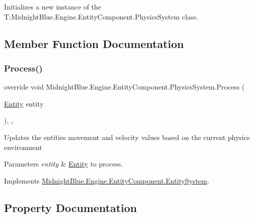 Initializes a new instance of the T\+:\+Midnight\+Blue.\+Engine.\+Entity\+Component.\+Physics\+System class. 



\subsection{Member Function Documentation}
\hypertarget{class_midnight_blue_1_1_engine_1_1_entity_component_1_1_physics_system_ab54f8db4bba2df1072b0fa3a3f4d47de}{}\label{class_midnight_blue_1_1_engine_1_1_entity_component_1_1_physics_system_ab54f8db4bba2df1072b0fa3a3f4d47de} 
\subsubsection{\texorpdfstring{Process()}{Process()}}
{\footnotesize\ttfamily override void Midnight\+Blue.\+Engine.\+Entity\+Component.\+Physics\+System.\+Process (\begin{DoxyParamCaption}\item[{\hyperlink{class_midnight_blue_1_1_engine_1_1_entity_component_1_1_entity}{Entity}}]{entity }\end{DoxyParamCaption})\hspace{0.3cm}{\ttfamily [inline]}, {\ttfamily [protected]}, {\ttfamily [virtual]}}



Updates the entities movement and velocity values based on the current physics environment 


\begin{DoxyParams}{Parameters}
{\em entity} & \hyperlink{class_midnight_blue_1_1_engine_1_1_entity_component_1_1_entity}{Entity} to process.\\
\hline
\end{DoxyParams}


Implements \hyperlink{class_midnight_blue_1_1_engine_1_1_entity_component_1_1_entity_system_a94aa715ac6bfe9a720c3d12d56c7598c}{Midnight\+Blue.\+Engine.\+Entity\+Component.\+Entity\+System}.



\subsection{Property Documentation}
\hypertarget{class_midnight_blue_1_1_engine_1_1_entity_component_1_1_physics_system_a7217fe220bbdf83bae97d5c90a26b929}{}\label{class_midnight_blue_1_1_engine_1_1_entity_component_1_1_physics_system_a7217fe220bbdf83bae97d5c90a26b929} 
